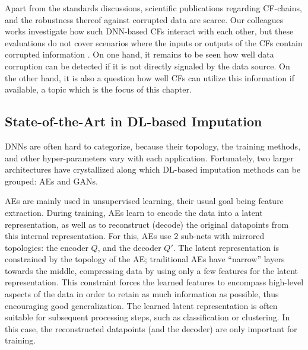 				Apart from the standards discussions, scientific publications regarding \ac{CF}-chains, and the robustness thereof against corrupted data are scarce.
				Our colleagues works investigate how such \ac{DNN}-based \acp{CF} interact with each other, but these evaluations do not cover scenarios where the inputs or outputs of the \acp{CF} contain corrupted information \cite{anu_can_1, anu_can_2}.
				On one hand, it remains to be seen how well data corruption can be detected if it is not directly signaled by the data source. 
				On the other hand, it is also a question how well \acp{CF} can utilize this information if available, a topic which is the focus of this chapter.
		
			\subsection{State-of-the-Art in DL-based Imputation}

				\acp{DNN} are often hard to categorize, because their topology, the training methods, and other hyper-parameters vary with each application.
				Fortunately, two larger architectures have crystallized along which \ac{DL}-based imputation methods can be grouped: \acp{AE} and \acp{GAN}.
				
				\acp{AE} are mainly used in unsupervised learning, their usual goal being feature extraction.
				During training, \acp{AE} learn to encode the data into a latent representation, as well as to reconstruct (decode) the original datapoints from this internal representation.
				For this, \acp{AE} use $2$ sub-nets with mirrored topologies: the encoder $Q$, and the decoder $Q'$.
				The latent representation is constrained by the topology of the \ac{AE}; traditional \acp{AE} have ``narrow'' layers towards the middle, compressing data by using only a few features for the latent representation.
				This constraint forces the learned features to encompass high-level aspects of the data in order to retain as much information as possible, thus encouraging good generalization.
				The learned latent representation is often suitable for subsequent processing steps, such as classification or clustering.
				In this case, the reconstructed datapoints (and the decoder) are only important for training.
				
